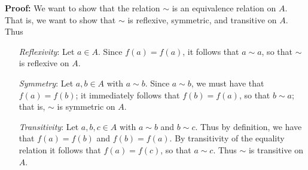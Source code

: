 \begin{enumerate}
      \textbf{Proof:} We want to show that the relation $\sim$ is an equivalence
      relation on $A$. That is, we want to show that $\sim$ is reflexive,
      symmetric, and transitive on $A$. Thus
      \begin{enumerate}
         \item[\textit{Reflexivity}:]  Let $a \in A$. Since $f(a) = f(a)$, it
                                       follows that $a \sim a$, so that $\sim$ 
                                       is reflexive on $A$.
         \item[\textit{Symmetry}:]     Let $a, b \in A$ with $a \sim b$. Since
                                       $a \sim b$, we must have that
                                       $f(a) = f(b)$; it immediately follows    
                                       that $f(b) = f(a)$, so that $b \sim a$;
                                       that is, $\sim$ is symmetric on $A$.
         \item[\textit{Transitivity}:] Let $a, b, c \in A$ with $a \sim b$ and
                                       $b \sim c$. Thus by definition, we have
                                       that $f(a) = f(b)$ and $f(b) = f(a)$. By
                                       transitivity of the equality relation it
                                       follows that $f(a) = f(c)$, so that
                                       $a \sim c$. Thus $\sim$ is transitive on
                                       $A$.
      \end{enumerate}


\end{enumerate}
